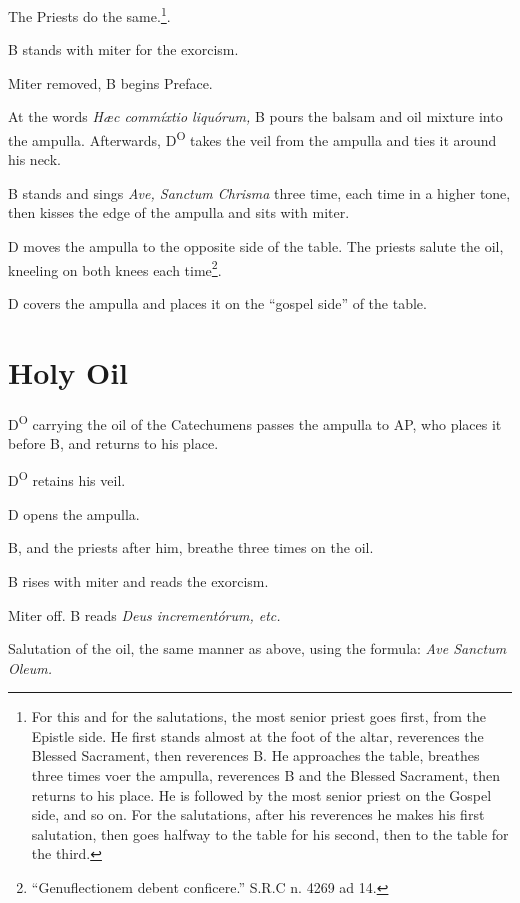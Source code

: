 {\rubric The Priests do the same.\footnote{For this and for the salutations, the
most senior priest goes first, from the Epistle side. He first stands almost at
the foot of the altar, reverences the Blessed Sacrament, then reverences B. He
approaches the table, breathes three times voer the ampulla, reverences B and
the Blessed Sacrament, then returns to his place. He is followed by the most
senior priest on the Gospel side, and so on. For the salutations, after his
reverences he makes his first salutation, then goes halfway to the table for
his second, then to the table for the third.}.

\rubric B stands with miter for the exorcism.

\rubric Miter removed, B begins Preface. 

\rubric At the words \textit{Hæc commíxtio liquórum,} B pours the balsam and
oil mixture into the ampulla. Afterwards, D\textsuperscript{O} takes the veil
from the ampulla and ties it around his neck.

\rubric B stands and sings \textit{Ave, Sanctum Chrisma} three time, each time
in a higher tone, then kisses the edge of the ampulla and sits with miter.

\rubric D moves the ampulla to the opposite side of the table. The priests
salute the oil, kneeling on both knees each time\footnote{``Genuflectionem
debent conficere.'' S.R.C n. 4269 ad 14.}.

\rubric D covers the ampulla and places it on the ``gospel side'' of the table.

\section{Holy Oil}

\rubric D\textsuperscript{O} carrying the oil of the Catechumens passes the
ampulla to AP, who places it before B, and returns to his place. 

\rubric D\textsuperscript{O} retains his veil.

\rubric D opens the ampulla.

\rubric B, and the priests after him, breathe three times on the oil.

\rubric B rises with miter and reads the exorcism.

\rubric Miter off. B reads \textit{Deus incrementórum, etc.}

\rubric Salutation of the oil, the same manner as above, using the formula:
\textit{Ave Sanctum Oleum.}

}
